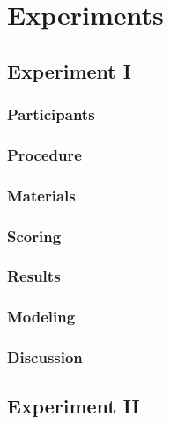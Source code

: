 \documentclass[]{book}
\theoremstyle{definition}
\theoremstyle{definition}
\theoremstyle{definition}
\theoremstyle{remark}
\begin{document}
\hypertarget{experiments-1}{%
\section{Experiments}\label{experiments-1}}

\hypertarget{experiment-i}{%
\subsection{Experiment I}\label{experiment-i}}

\hypertarget{participants-1}{%
\subsubsection{Participants}\label{participants-1}}

\hypertarget{procedure-1}{%
\subsubsection{Procedure}\label{procedure-1}}

\hypertarget{materials-1}{%
\subsubsection{Materials}\label{materials-1}}

\hypertarget{scoring}{%
\subsubsection{Scoring}\label{scoring}}

\hypertarget{results-1}{%
\subsubsection{Results}\label{results-1}}

\hypertarget{modeling-1}{%
\subsubsection{Modeling}\label{modeling-1}}

\hypertarget{discussion-1}{%
\subsubsection{Discussion}\label{discussion-1}}

\hypertarget{experiment-ii}{%
\subsection{Experiment II}\label{experiment-ii}}
\end{document}
